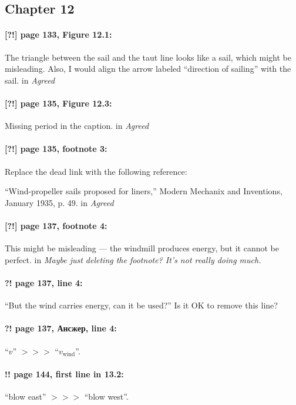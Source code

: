 \documentclass[twoside]{article}
\begin{document}
\subsection*{Chapter 12}

\paragraph{[?!] page 133, Figure 12.1:} The triangle between the sail and the taut line looks like a sail, which might be misleading. Also, I would align the arrow labeled ``direction of sailing'' with the sail.
 in {\it  Agreed} 

\paragraph{[?!] page 135, Figure 12.3:} Missing period in the caption.
 in {\it  Agreed} 

\paragraph{[?!] page 135, footnote 3:} Replace the dead link with the following reference:

``Wind-propeller sails proposed for liners,'' Modern Mechanix and Inventions, January 1935, p. 49.
 in {\it  Agreed} 

\paragraph{[?!] page 137, footnote 4:} This might be misleading — the windmill produces energy, but it cannot be perfect.
 in {\it  Maybe just deleting the footnote? It's not really doing much.}

\paragraph{?! page 137, line 4:}
``But the wind carries energy, can it be used?''
Is it OK to remove this line?

\paragraph{?! page 137, Ансжер, line 4:} ``$v$''  $>\!>\!>$ ``$v_{\text{wind}}$''.

\paragraph{!! page 144, first line in 13.2:} ``blow east'' $>\!>\!>$ ``blow west''.
\end{document}
